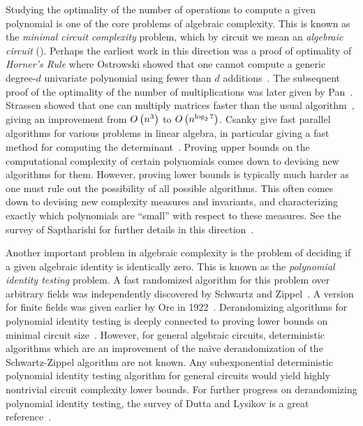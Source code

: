 \documentclass[letterpaper, 11pt]{amsart}
\begin{document}
Studying the optimality of the number of operations to compute a given polynomial is one of the core problems of algebraic complexity.
This is known as the \emph{minimal circuit complexity} problem, which by circuit we mean an \emph{algebraic circuit} ().
Perhaps the earliest work in this direction was a proof of optimality of \emph{Horner's Rule} where Ostrowski showed that one cannot compute a generic degree-$d$ univariate polynomial using fewer than $d$ additions~\cite{Ost54}.
The subsequent proof of the optimality of the number of multiplications was later given by Pan~\cite{Pan66}.
Strassen showed that one can multiply matrices faster than the usual algorithm~\cite{Str69}, giving an improvement from $O\kern-0.0pt\left(n^3\right)$ to $O\kern-0.0pt\left(n^{\log_2 7}\right)$.
Csanky give fast parallel algorithms for various problems in linear algebra, in particular giving a fast method for computing the determinant~\cite{Csa76}.
Proving upper bounds on the computational complexity of certain polynomials comes down to devising new algorithms for them.
However, proving lower bounds is typically much harder as one must rule out the possibility of all possible algorithms.
This often comes down to devising new complexity measures and invariants, and characterizing exactly which polynomials are ``small'' with respect to these measures.
See the survey of Saptharishi for further details in this direction~\cite{Sap21}.

Another important problem in algebraic complexity is the problem of deciding if a given algebraic identity is identically zero.
This is known as the \emph{polynomial identity testing} problem.
A fast randomized algorithm for this problem over arbitrary fields was independently discovered by Schwartz and Zippel~\cite{Sch80, Zip79}.
A version for finite fields was given earlier by Ore in 1922~\cite{Ore22}.
Derandomizing algorithms for polynomial identity testing is deeply connected to proving lower bounds on minimal circuit size~\cite{NW94, KI04}.
However, for general algebraic circuits, deterministic algorithms which are an improvement of the naive derandomization of the Schwartz-Zippel algorithm are not known.
Any subexponential deterministic polynomial identity testing algorithm for general circuits would yield highly nontrivial circuit complexity lower bounds.
For further progress on derandomizing polynomial identity testing, the survey of Dutta and Lysikov is a great reference~\cite{DL25}.
\end{document}
